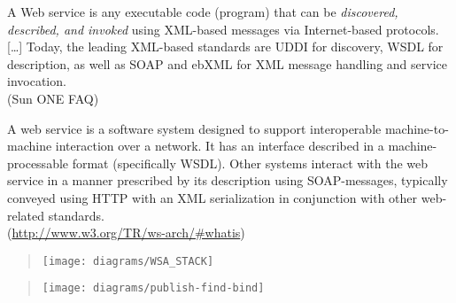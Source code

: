 \documentclass{sepslide-soa-faked} %
\begin{document}
\begin{slide}
\begin{flushleft}
{\sffamily
A Web service is any executable code (program) that can be
\emph{discovered, described, and invoked} using XML-based messages via
Internet-based protocols.
[\ldots]
Today, the leading XML-based standards are UDDI for discovery, WSDL
for description, as well as SOAP and ebXML for XML message handling
and service invocation. 
} \medskip \\
(Sun ONE FAQ)
\end{flushleft}
\end{slide}

\begin{slide}
\begin{flushleft}
{\sffamily
A web service is a software system designed to support
interoperable machine-to-machine interaction over a network. It has an
interface described in a machine-processable format (specifically
WSDL). Other systems interact with the web service in a manner
prescribed by its description using SOAP-messages, typically conveyed
using HTTP with an XML serialization in conjunction with other
web-related standards.
} \medskip \\
(\url{http://www.w3.org/TR/ws-arch/\#whatis})
\end{flushleft}
\end{slide}

\begin{slide}
\begin{quote}
\texttt{[image: diagrams/WSA\_STACK]}
\end{quote}
\end{slide}

\begin{slide}
\begin{quote}
\texttt{[image: diagrams/publish-find-bind]}
\end{quote}
\end{slide}
\end{document}
